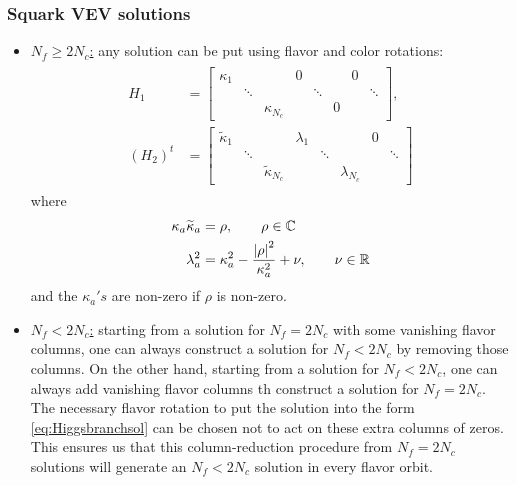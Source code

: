         \subsubsection{Squark VEV solutions}

            \begin{itemize}
                \item \underline{$N_f\geq2N_c$:} any solution can be put using flavor and color rotations:
                \begin{align}
                    \begin{split}
                    H_1 &= 
                    \begin{bmatrix}
                        \kappa_1 & & & 0 & & & 0 & \\
                        & \ddots & & & \ddots & & & \ddots \\
                        & & \kappa_{N_c} & & & 0 & & 
                    \end{bmatrix},\\
                    (H_2)^t &= 
                    \begin{bmatrix}
                        \tilde{\kappa}_1 & & & \lambda_1 & & & 0 & \\
                        & \ddots & & & \ddots & & & \ddots \\
                        & & \tilde{\kappa}_{N_c} & & & \lambda_{N_c} & & 
                    \end{bmatrix}
                \end{split}\label{eq:Higgsbranchsol}
                \end{align}
                where
                \begin{align}
                    \kappa_a\widetilde{\kappa}_a &= \rho,\qquad\rho\in\mathbb{C} \label{eq:Higgsbrachcdt1}\\
                    \lambda^2_a &= \kappa^2_a-\frac{\abs{\rho}^2}{\kappa^2_a}+\nu,\qquad\nu\in\mathbb{R} \label{eq:Higgsbrachcdt2}
                \end{align}
                and the $\kappa_a's$ are non-zero if $\rho$ is non-zero.
                \item \underline{$N_f<2N_c$:} starting from a solution for $N_f=2N_c$ with some vanishing flavor columns, one can always construct a solution for $N_f<2N_c$ by removing those columns. On the other hand, starting from a solution for $N_f<2N_c$, one can always add vanishing flavor columns th construct a solution for $N_f=2N_c$. The necessary flavor rotation to put the solution into the form \eqref{eq:Higgsbranchsol} can be chosen not to act on these extra columns of zeros. This ensures us that this column-reduction procedure from $N_f=2N_c$ solutions will generate an $N_f<2N_c$ solution in every flavor orbit.
                

\end{itemize}
